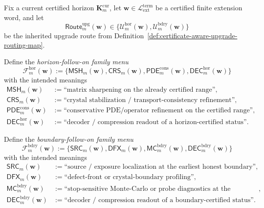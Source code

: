\begin{definition}
\label{def:normalized-follow-on-upgrade-families}
Fix a current certified horizon \(\mathbf K_m^{\mathrm{cur}}\), let \(\mathbf w\in \mathcal L_{\mathrm{ext}}^{\mathrm{term}}\) be a certified finite extension word, and let
\[
  \mathsf{Route}^{\mathrm{upg}}_{m}(\mathbf w)
  \in
  \{\mathcal U^{\mathrm{hor}}_{m}(\mathbf w),\mathcal U^{\mathrm{bdry}}_{m}(\mathbf w)\}
\]
be the inherited upgrade route from Definition~\ref{def:certificate-aware-upgrade-routing-map}.

Define the \emph{horizon-follow-on family menu}
\[
  \mathcal F^{\mathrm{hor}}_{m}(\mathbf w)
  :=
  \{\mathsf{MSH}_{m}(\mathbf w),\mathsf{CRS}_{m}(\mathbf w),\mathsf{PDE}^{\mathrm{cons}}_{m}(\mathbf w),\mathsf{DEC}^{\mathrm{hor}}_{m}(\mathbf w)\}
\]
with the intended meanings
\begin{align*}
  \mathsf{MSH}_{m}(\mathbf w) &:= \text{``matrix sharpening on the already certified range''},\\
  \mathsf{CRS}_{m}(\mathbf w) &:= \text{``crystal stabilization / transport-consistency refinement''},\\
  \mathsf{PDE}^{\mathrm{cons}}_{m}(\mathbf w) &:= \text{``conservative PDE/operator refinement on the certified range''},\\
  \mathsf{DEC}^{\mathrm{hor}}_{m}(\mathbf w) &:= \text{``decoder / compression readout of a horizon-certified status''}.
\end{align*}

Define the \emph{boundary-follow-on family menu}
\[
  \mathcal F^{\mathrm{bdry}}_{m}(\mathbf w)
  :=
  \{\mathsf{SRC}_{m}(\mathbf w),\mathsf{DFX}_{m}(\mathbf w),\mathsf{MC}^{\mathrm{bdry}}_{m}(\mathbf w),\mathsf{DEC}^{\mathrm{bdry}}_{m}(\mathbf w)\}
\]
with the intended meanings
\begin{align*}
  \mathsf{SRC}_{m}(\mathbf w) &:= \text{``source / exposure localization at the earliest honest boundary''},\\
  \mathsf{DFX}_{m}(\mathbf w) &:= \text{``defect-front or crystal-boundary profiling''},\\
  \mathsf{MC}^{\mathrm{bdry}}_{m}(\mathbf w) &:= \text{``stop-sensitive Monte-Carlo or probe diagnostics at the boundary side''},\\
  \mathsf{DEC}^{\mathrm{bdry}}_{m}(\mathbf w) &:= \text{``decoder / compression readout of a boundary-certified status''}.
\end{align*}


\end{definition}
